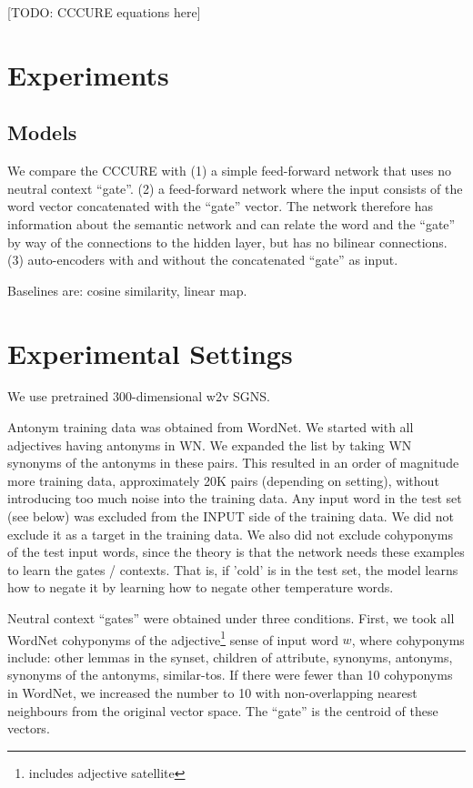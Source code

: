 \documentclass[11pt]{article}
\begin{document}
[TODO: CCCURE equations here]

\section{Experiments}

\subsection{Models}

We compare the CCCURE with (1) a simple feed-forward network that uses no neutral context ``gate''. (2) a feed-forward network where the input consists of the word vector concatenated with the ``gate'' vector. The network therefore has information about the semantic network and can relate the word and the ``gate'' by way of the connections to the hidden layer,  but has no bilinear connections. (3) auto-encoders with and without the concatenated ``gate'' as input.

Baselines are: cosine similarity, linear map.

\section{Experimental Settings}

We use pretrained 300-dimensional w2v SGNS.

Antonym training data was obtained from WordNet. We started with all adjectives having antonyms in WN. We expanded the list by taking WN synonyms of the antonyms in these pairs. This resulted in an order of magnitude more training data, approximately 20K pairs (depending on setting), without introducing too much noise into the training data. Any input word in the test set (see below) was excluded from the INPUT side of the training data. We did not exclude it as a target in the training data. We also did not exclude cohyponyms of the test input words, since the theory is that the network needs these examples to learn the gates / contexts. That is, if 'cold' is in the test set, the model learns how to negate it by learning how to negate other temperature words.

Neutral context ``gates'' were obtained under three conditions. First, we took all WordNet cohyponyms of the adjective\footnote{includes adjective satellite} sense of input word $w$, where cohyponyms include: other lemmas in the synset, children of attribute, synonyms, antonyms, synonyms of the antonyms, similar-tos. If there were fewer than 10 cohyponyms in WordNet, we increased the number to 10 with non-overlapping nearest neighbours from the original vector space. The ``gate'' is the centroid of these vectors.
\end{document}
